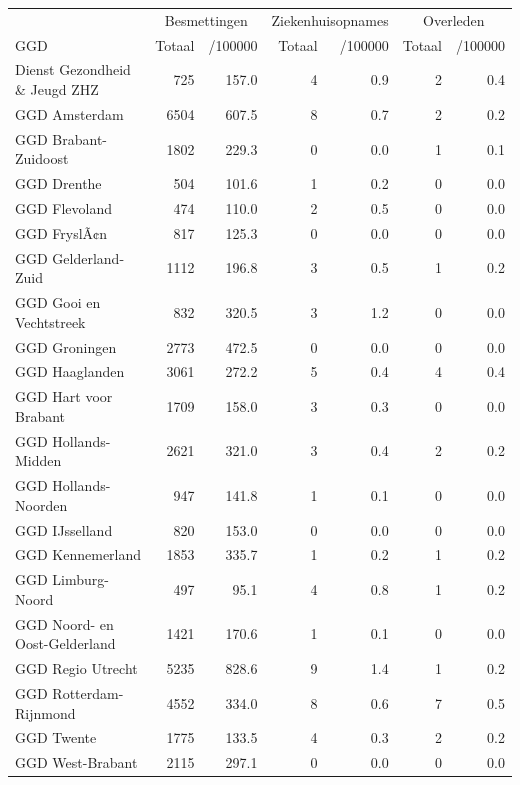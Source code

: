 \documentclass[
  english,
  man,floatsintext]{apa6}
\begin{document}
\begin{table}
\centering\begingroup\fontsize{10}{12}\selectfont

\begin{threeparttable}
\begin{tabular}{lrrrrrr}
\toprule
\multicolumn{1}{c}{ } & \multicolumn{2}{c}{Besmettingen} & \multicolumn{2}{c}{Ziekenhuisopnames} & \multicolumn{2}{c}{Overleden} \\
\cmidrule(l{3pt}r{3pt}){2-3} \cmidrule(l{3pt}r{3pt}){4-5} \cmidrule(l{3pt}r{3pt}){6-7}
GGD & Totaal & /100000 & Totaal & /100000 & Totaal & /100000\\
\midrule
Dienst Gezondheid \& Jeugd ZHZ & 725 & 157.0 & 4 & 0.9 & 2 & 0.4\\
GGD Amsterdam & 6504 & 607.5 & 8 & 0.7 & 2 & 0.2\\
GGD Brabant-Zuidoost & 1802 & 229.3 & 0 & 0.0 & 1 & 0.1\\
GGD Drenthe & 504 & 101.6 & 1 & 0.2 & 0 & 0.0\\
GGD Flevoland & 474 & 110.0 & 2 & 0.5 & 0 & 0.0\\
GGD FryslÃ¢n & 817 & 125.3 & 0 & 0.0 & 0 & 0.0\\
GGD Gelderland-Zuid & 1112 & 196.8 & 3 & 0.5 & 1 & 0.2\\
GGD Gooi en Vechtstreek & 832 & 320.5 & 3 & 1.2 & 0 & 0.0\\
GGD Groningen & 2773 & 472.5 & 0 & 0.0 & 0 & 0.0\\
GGD Haaglanden & 3061 & 272.2 & 5 & 0.4 & 4 & 0.4\\
GGD Hart voor Brabant & 1709 & 158.0 & 3 & 0.3 & 0 & 0.0\\
GGD Hollands-Midden & 2621 & 321.0 & 3 & 0.4 & 2 & 0.2\\
GGD Hollands-Noorden & 947 & 141.8 & 1 & 0.1 & 0 & 0.0\\
GGD IJsselland & 820 & 153.0 & 0 & 0.0 & 0 & 0.0\\
GGD Kennemerland & 1853 & 335.7 & 1 & 0.2 & 1 & 0.2\\
GGD Limburg-Noord & 497 & 95.1 & 4 & 0.8 & 1 & 0.2\\
GGD Noord- en Oost-Gelderland & 1421 & 170.6 & 1 & 0.1 & 0 & 0.0\\
GGD Regio Utrecht & 5235 & 828.6 & 9 & 1.4 & 1 & 0.2\\
GGD Rotterdam-Rijnmond & 4552 & 334.0 & 8 & 0.6 & 7 & 0.5\\
GGD Twente & 1775 & 133.5 & 4 & 0.3 & 2 & 0.2\\
GGD West-Brabant & 2115 & 297.1 & 0 & 0.0 & 0 & 0.0\\

\end{tabular}
\end{threeparttable}
\end{table}
\end{document}
